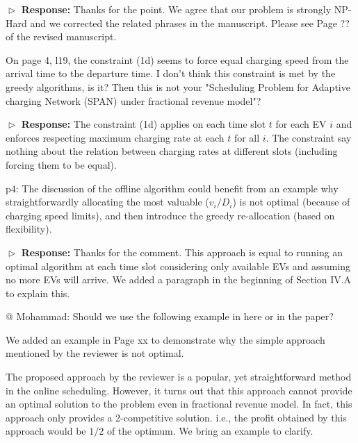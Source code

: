 \documentclass[11pt]{article}
\begin{document}
$\vartriangleright$ \noindent\textbf{Response:} 
Thanks for the point. We agree that our problem is strongly NP-Hard and we corrected the related phrases in the manuscript. Please see Page ?? of the revised manuscript. 

\vspace{3mm}
{\color{blue} On page 4, l19, the constraint (1d) seems to force equal charging speed from the arrival time to the departure time. I don't think this constraint is met by the greedy algorithms, is it? Then this is not your "Scheduling Problem for Adaptive charging Network (SPAN) under fractional revenue model"? }
\vspace{3mm}

$\vartriangleright$ \noindent\textbf{Response:} 
The constraint (1d) applies on each time slot $t$ for each EV $i$ and enforces respecting maximum charging rate at each $t$ for all $i$. The constraint say nothing about the relation between charging rates at different slots (including forcing them to be equal).

\vspace{3mm}
{\color{blue} p4: The discussion of the offline algorithm could benefit from an example why straightforwardly allocating the most valuable ($v_i/D_i$) is not optimal (because of charging speed limits), and then introduce the greedy re-allocation (based on flexibility). }
\vspace{3mm}

$\vartriangleright$ \noindent\textbf{Response:} 
Thanks for the comment. This approach is equal to running an optimal algorithm at each time slot considering only available EVs and assuming no more EVs will arrive. We added a paragraph in the beginning of Section IV.A to explain this. 

{\color{red}@ Mohammad: Should we use the following example in here or in the paper?}

We added an example in Page xx to demonstrate why the simple approach mentioned by the reviewer is not optimal.

The proposed approach by the reviewer is a popular, yet straightforward method in the online scheduling. However, it turns out that this approach cannot provide an optimal solution to the problem even in fractional revenue model. In fact, this approach only provides a 2-competitive solution. i.e., the profit obtained by this approach would be $1/2$ of the optimum. We bring an example to clarify.
\end{document}
